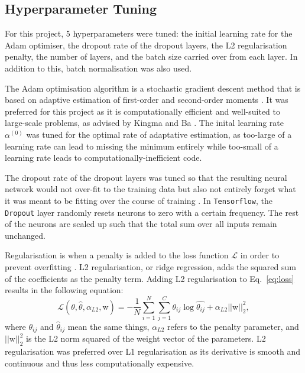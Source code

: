 \documentclass[11pt,a4paper]{article}
\begin{document}
\subsection{Hyperparameter Tuning}
For this project, 5 hyperparameters were tuned: the initial learning rate for the Adam optimiser, the dropout rate of the dropout layers, the L2 regularisation penalty, the number of layers, and the batch size carried over from each layer. In addition to this, batch normalisation was also used.

The Adam optimisation algorithm is a stochastic gradient descent method that is based on adaptive estimation of first-order and second-order moments \citep{kingma2017adammethodstochasticoptimization}. It was preferred for this project as it is computationally efficient and well-suited to large-scale problems, as advised by Kingma and Ba \citep{kingma2017adammethodstochasticoptimization}. The inital learning rate $\alpha^{(0)}$ was tuned for the optimal rate of adaptative estimation, as too-large of a learning rate can lead to missing the minimum entirely while too-small of a learning rate leads to computationally-inefficient code.

The dropout rate of the dropout layers was tuned so that the resulting neural network would not over-fit to the training data but also not entirely forget what it was meant to be fitting over the course of training \citep{Mehta_2019}. In \texttt{Tensorflow}, the \texttt{Dropout} layer randomly resets neurons to zero with a certain frequency. The rest of the neurons are scaled up such that the total sum over all inputs remain unchanged.

Regularisation is when a penalty is added to the loss function $\mathcal{L}$ in order to prevent overfitting \citep{Mehta_2019}. L2 regularisation, or ridge regression, adds the squared sum of the coefficients as the penalty term. Adding L2 regularisation to Eq.~\ref{eq:loss} results in the following equation:
\begin{equation}
    \mathcal{L}(\theta, \hat{\theta}, \alpha_{L2}, \mathrm{w}) = - \frac{1}{N}\sum^N_{i=1}\sum^C_{j=1} \theta_{ij} \log{\hat{\theta_{ij}}} + \alpha_{L2} ||\mathrm{w}||^2_2,
\end{equation}
where $\theta_{ij}$ and $\hat{\theta}_{ij}$ mean the same things, $\alpha_{L2}$ refers to the penalty parameter, and $||\mathrm{w}||^2_2$ is the L2 norm squared of the weight vector of the parameters.
L2 regularisation was preferred over L1 regularisation as its derivative is smooth and continuous and thus less computationally expensive.
\end{document}
